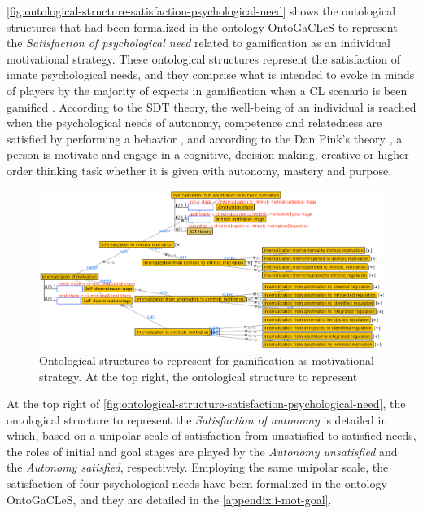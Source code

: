 \autoref{fig:ontological-structure-satisfaction-psychological-need} shows the ontological structures that had been formalized in the ontology OntoGaCLeS to represent the \emph{Satisfaction of psychological need} related to gamification as an individual motivational strategy. These ontological structures represent the satisfaction of innate psychological needs, and they comprise what is intended to evoke in minds of players by the majority of experts in gamification when a CL scenario is been gamified \cite{MoraRieraGonzalezArnedo-Moreno2015, SeabornFels2015}. According to the SDT theory, the well-being of an individual is reached when the psychological needs of autonomy, competence and relatedness are satisfied by performing a behavior \cite{DeciRyan1985, DeciRyan2010}, and according to the Dan Pink's theory \cite{Pink2011}, a person is motivate and engage in a cognitive, decision-making, creative or higher-order thinking task whether it is given with autonomy, mastery and purpose.

\begin{figure}[htb]
 \caption[Ontological structure to represent Satisfaction of psychological need]{Ontological structures to represent  for gamification as motivational strategy. At the top right, the ontological structure to represent }
 \label{fig:ontological-structure-satisfaction-psychological-need}
 \centering
 \includegraphics[width=1\textwidth]{images/chap-ontogacles1/ontological-structure-satisfaction-psychological-need.png}
 \fautor
\end{figure}

At the top right of \autoref{fig:ontological-structure-satisfaction-psychological-need}, the ontological structure to represent the \emph{Satisfaction of autonomy} is detailed in which, based on a unipolar scale of satisfaction from unsatisfied to satisfied needs, the roles of initial and goal stages are played by the \emph{Autonomy unsatisfied} and the \emph{Autonomy satisfied}, respectively. Employing the same unipolar scale, the satisfaction of four psychological needs have been formalized in the ontology OntoGaCLeS, and they are detailed in the \autoref{appendix:i-mot-goal}.

